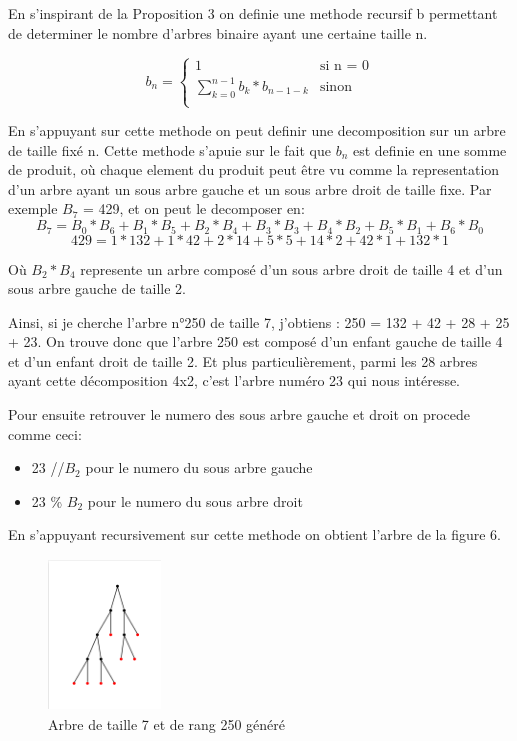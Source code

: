\documentclass[french]{article}
\begin{document}
En s'inspirant de la Proposition 3 on definie une methode recursif b permettant de determiner le nombre d'arbres binaire ayant une certaine taille n.

\begin{equation}
    b_n =
    \begin{cases}
        1 & \text{si n = 0}\\
        \sum_{k=0}^{n-1}b_k*b_{n-1-k}  & \text{sinon}\\
    \end{cases}      
\end{equation}

En s'appuyant sur cette methode on peut definir une decomposition sur un arbre de taille fixé n. Cette methode s'apuie sur le fait que \(b_n\) est definie en une somme de produit, où chaque element du produit peut être vu comme la representation d'un arbre ayant un sous arbre gauche et un sous arbre droit de taille fixe. Par exemple \(B_7\) = 429, et on peut le decomposer en:
\[B_7=B_0*B_6+B_1*B_5+B_2*B_4+B_3*B_3+B_4*B_2+B_5*B_1+B_6*B_0\]
\[429=1*132+1*42+2*14+5*5+14*2+42*1+132*1\]

Où \(B_2*B_4\) represente un arbre composé d'un sous arbre droit de taille 4 et d'un sous arbre gauche de taille 2.

Ainsi, si je cherche l'arbre n\si{\degree}250 de taille 7, j'obtiens : 250 = 132 + 42 + 28 + 25 + 23. On trouve donc que l'arbre 250 est composé d'un enfant gauche de taille 4 et d'un enfant droit de taille 2. Et plus particulièrement, parmi les 28 arbres ayant cette décomposition 4x2, c'est l'arbre numéro 23 qui nous intéresse.


Pour ensuite retrouver le numero des sous arbre gauche et droit on procede comme ceci:
\begin{itemize}
    \item 23 //\( B_2 \) pour le numero du sous arbre gauche
    \item 23 \% \(B_2\)   pour le numero du sous arbre droit
\end{itemize}

En s'appuyant recursivement sur cette methode on obtient l'arbre de la figure 6.

\begin{figure}[htp]
    \centering
    \includegraphics[width=3cm, height=4cm]{tree generation.png}
    \caption{Arbre de taille 7 et de rang 250 généré}
    \label{fig:generation d'arbre}
\end{figure}
\end{document}
